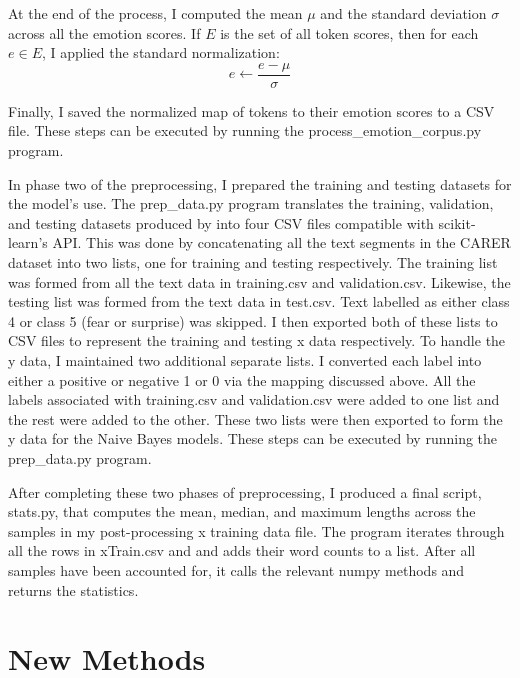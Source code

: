 \documentclass[11pt]{article}
\begin{document}
At the end of the process, I computed the mean $\mu$ and the standard deviation $\sigma$ across all the emotion scores. If $E$ is the set of all token scores, then for each $e \in E$, I applied the standard normalization:
$$
e \leftarrow \frac{e - \mu}{\sigma}
$$

Finally, I saved the normalized map of tokens to their emotion scores to a 
CSV file. These steps can be executed by running the process\_emotion\_corpus.py program.

In phase two of the preprocessing, I prepared the training and testing datasets for the model's use. The prep\_data.py program translates the training, validation, and testing datasets produced by \citet{saravia2018carer} into four CSV files compatible with scikit-learn's API. This was done by concatenating all the text segments in the CARER dataset into two lists, one for training and testing respectively. The training list was formed from all the text data in training.csv and validation.csv. Likewise, the testing list was formed from the text data in test.csv. Text labelled as either class 4 or class 5 (fear or surprise) was skipped. I then exported both of these lists to CSV files to represent the training and testing x data respectively. To handle the y data, I maintained two additional separate lists. I converted each label into either a positive or negative 1 or 0 via the mapping discussed above. All the labels associated with training.csv and validation.csv were added to one list and the rest were added to the other. These two lists were then exported to form the y data for the Naive Bayes models. These steps can be executed by running the prep\_data.py program.

After completing these two phases of preprocessing, I produced a final script, stats.py, that computes the mean, median, and maximum lengths across the samples in my post-processing x training data file. The program iterates through all the rows in xTrain.csv and and adds their word counts to a list. After all samples have been accounted for, it calls the relevant numpy methods and returns the statistics.

\section{New Methods}
\end{document}
